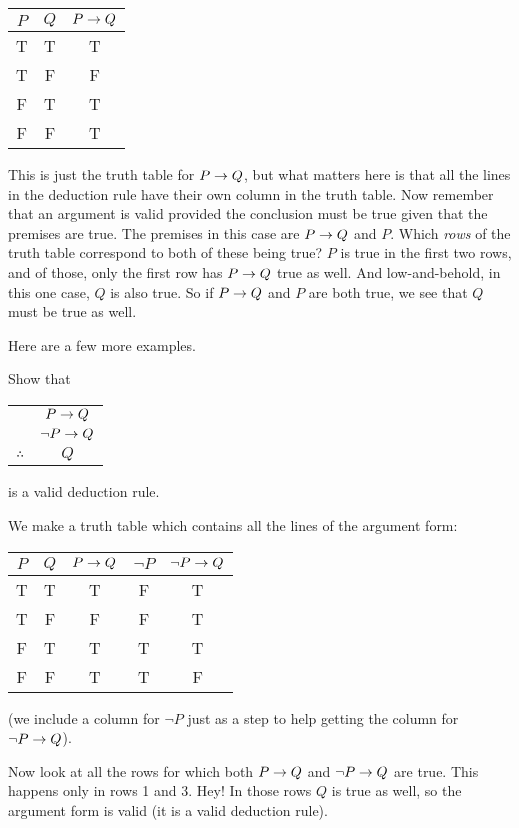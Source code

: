 \documentclass[12pt]{article}
\begin{document}
\begin{center}
 \begin{tabular}{c|c||c}
  $P$ & $Q$ & $P\rightarrow Q$ \\ \hline
  T & T & T \\
  T & F & F \\
  F & T & T \\
  F & F & T
 \end{tabular}
\end{center}

This is just the truth table for $P \rightarrow Q$, but what matters here is that all the lines in the deduction rule have their own column in the truth table.  Now remember that an argument is valid provided the conclusion must be true given that the premises are true.  The premises in this case are $P \rightarrow Q$ and $P$.  Which {\em rows} of the truth table correspond to both of these being true?  $P$ is true in the first two rows, and of those, only the first row has $P \rightarrow Q$ true as well.   And low-and-behold, in this one case, $Q$ is also true.  So if $P\rightarrow Q$ and $P$ are both true, we see that $Q$ must be true as well.

Here are a few more examples.

\begin{example}
 Show that 
  \begin{tabular}{rc}
   & $P \rightarrow Q$\\
   & $\neg P \rightarrow Q$ \\ \hline
   $\therefore$ & $Q$
  \end{tabular}
is a valid deduction rule.

\begin{solution}
 We make a truth table which contains all the lines of the argument form:
 \begin{center}
  \begin{tabular}{c|c||c|c|c}
   $P$ & $Q$ & $P\rightarrow Q$ & $\neg P$ & $\neg P \rightarrow Q$ \\ \hline
   T & T & T & F & T \\ 
   T & F & F & F & T \\
   F & T & T & T & T \\
   F & F & T & T & F 
  \end{tabular}
 \end{center}
(we include a column for $\neg P$ just as a step to help getting the column for $\neg P \rightarrow Q$). 

Now look at all the rows for which both $P \rightarrow Q$ and $\neg P \rightarrow Q$ are true.  This happens only in rows 1 and 3.  Hey! In those rows $Q$ is true as well, so the argument form is valid (it is a valid deduction rule).
\end{solution}

\end{example}
\end{document}
